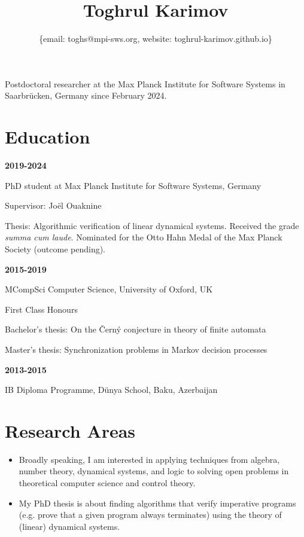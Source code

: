 \documentclass{article}
\title{\bfseries\Huge Toghrul Karimov}
\author{\{email: toghs@mpi-sws.org, website: toghrul-karimov.github.io\}}
\date{}
\begin{document}
	\maketitle
	
	Postdoctoral researcher at the Max Planck Institute for Software Systems in Saarbr\"ucken, Germany since February 2024.
	
	\section*{Education}
		\begin{minipage}{0.3\textwidth}
			\hspace{0.5cm} \textbf{2019-2024}
		\end{minipage}
		\vspace*{0.25cm}
		\begin{minipage}{0.7\textwidth}
			PhD student at Max Planck Institute for Software Systems, Germany
			
			Supervisor: Jo\"el Ouaknine 
			
			Thesis: Algorithmic verification of linear dynamical systems.
			Received the grade \emph{summa cum laude}.
			Nominated for the Otto Hahn Medal of the Max Planck Society (outcome pending).
		\end{minipage}
		\vspace{0.25cm}
		\begin{minipage}{0.3\textwidth}
		\hspace{0.5cm} \textbf{2015-2019}
		\end{minipage}
	\begin{minipage}{0.7\textwidth}
		MCompSci Computer Science, University of Oxford, UK
		
		First Class Honours
		
		Bachelor's thesis: On the Černý conjecture in theory of finite automata
		
		Master's thesis: Synchronization problems in Markov decision processes 
	\end{minipage}
	\vspace{0.25cm}
	\begin{minipage}{0.3\textwidth}
		\hspace{0.5cm} \textbf{2013-2015}
	\end{minipage}
	\begin{minipage}{0.7\textwidth}
		IB Diploma Programme, D\"unya School, Baku, Azerbaijan
	\end{minipage}

	\section*{Research Areas}
	\begin{itemize}
		\item Broadly speaking, I am interested in applying techniques from algebra, number theory, dynamical systems, and logic to solving open problems in theoretical computer science and control theory. 
		\item My PhD thesis is about finding algorithms that verify imperative programs (e.g. prove that a given program always terminates) using the theory of (linear) dynamical systems.
	\end{itemize}
\end{document}
